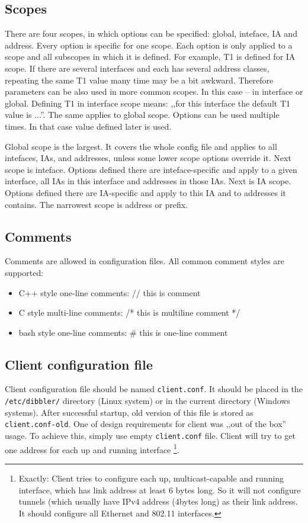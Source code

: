 \subsection{Scopes}
There are four scopes, in which options can be specified: global,
inteface, IA and address. Every option is specific for one scope.
Each option is only applied to a scope and all subscopes in which it is
defined. For example, T1 is defined for
IA scope. If there are several interfaces and each has several address
classes, repeating the same T1 value many time may be a bit awkward.
Therefore parameters can be also used in more common scopes. In this
case -- in interface or global. Defining T1 in interface scope means:
,,for this interface the default T1 value is ...''. The same applies
to global scope. Options can be used multiple times. In that case
value defined later is used.

Global scope is the largest. It covers the whole config file and
applies to all intefaces, IAs, and addresses, unless some lower scope
options override it. Next scope is inteface. Options defined there
are inteface-specific and apply to a given interface, all IAs in this
interface and addresses in those IAs. Next is IA scope. Options
defined there are IA-specific and apply to this IA and to addresses it
contains. The narrowest scope is address or prefix.

\subsection{Comments}

Comments are allowed in configuration files. All common comment styles are supported:
\begin{itemize}
\item C++ style one-line comments: // this is comment
\item C style multi-line comments: /* this is multiline comment */
\item bash style one-line comments: \# this is one-line comment
\end{itemize}

\subsection{Client configuration file}
\label{client-cfg-file}
Client configuration file should be named \verb+client.conf+. It should be
placed in the \verb+/etc/dibbler/+ directory (Linux system) or in the
current directory (Windows systems). After successful startup, old
version of this file is stored as \verb+client.conf-old+. One of
design requirements for client was ,,out of the box'' usage. To
achieve this, simply use empty
\verb+client.conf+ file. Client will try to get one address for each up and
running interface \footnote{Exactly: Client tries to configure each
  up, multicast-capable and running interface, which has link address
  at least 6 bytes long. So it will not configure tunnels (which
  usually have IPv4 address (4bytes long) as their link address. It
  should configure all Ethernet and 802.11 interfaces.}.

